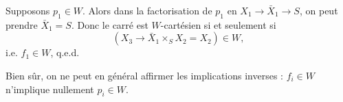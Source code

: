 \documentclass[11pt]{article}
\newcommand{\msp}[1]{\marginpar{\footnotesize [#1]}}
\begin{document}
\msp{page 261}
Supposons $p_1\in W$. Alors dans la factorisation de $p_1$ en $X_1\longrightarrow\bar{X}_1\longrightarrow S$, on peut prendre $\bar{X}_1=S$. Donc le carré est $W$-cartésien si et seulement si
\[
(X_3\longrightarrow\bar{X}_1\times_S X_2=X_2)\in W,
\]
i.e. $f_1\in W$, q.e.d.

Bien sûr, on ne peut en général affirmer les implications inverses : $f_i\in W$ n'implique nullement $p_i\in W$.
\end{document}
